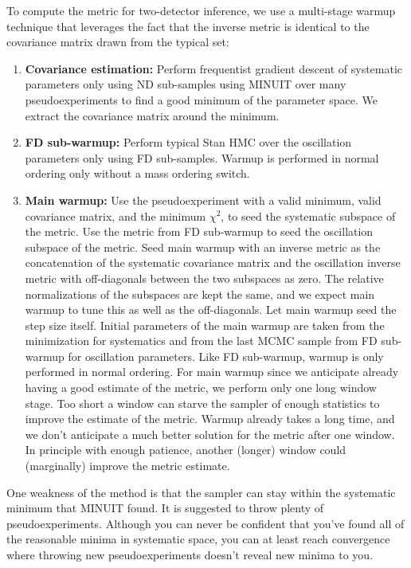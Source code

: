\documentclass{article}
\begin{document}
To compute the metric for two-detector inference, we use a multi-stage warmup technique that leverages the fact that the inverse metric is identical to the covariance matrix drawn from the typical set:
\begin{enumerate}
  \item \textbf{Covariance estimation:} Perform frequentist gradient descent of systematic parameters only using ND sub-samples using MINUIT over many pseudoexperiments to find a good minimum of the parameter space. We extract the covariance matrix around the minimum.
  \item \textbf{FD sub-warmup:} Perform typical Stan HMC over the oscillation parameters only using FD sub-samples. Warmup is performed in normal ordering only without a mass ordering switch.
  \item \textbf{Main warmup:} Use the pseudoexperiment with a valid minimum, valid covariance matrix, and the minimum $\chi^2$, to seed the systematic subspace of the metric. Use the metric from FD sub-warmup to seed the oscillation subspace of the metric. Seed main warmup with an inverse metric as the concatenation of the systematic covariance matrix and the oscillation inverse metric with off-diagonals between the two subspaces as zero. The relative normalizations of the subspaces are kept the same, and we expect main warmup to tune this as well as the off-diagonals. Let main warmup seed the step size itself. Initial parameters of the main warmup are taken from the minimization for systematics and from the last MCMC sample from FD sub-warmup for oscillation parameters. Like FD sub-warmup, warmup is only performed in normal ordering. For main warmup since we anticipate already having a good estimate of the metric, we perform only one long window stage. Too short a window can starve the sampler of enough statistics to improve the estimate of the metric. Warmup already takes a long time, and we don't anticipate a much better solution for the metric after one window. In principle with enough patience, another (longer) window could (marginally) improve the metric estimate.
\end{enumerate}

One weakness of the method is that the sampler can stay within the systematic minimum that MINUIT found. It is suggested to throw plenty of pseudoexperiments. Although you can never be confident that you've found all of the reasonable minima in systematic space, you can at least reach convergence where throwing new pseudoexperiments doesn't reveal new minima to you.
\end{document}
